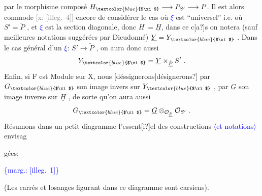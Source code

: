 \documentclass[11pt]{article}
\newcommand{\scanpage}[1]{\par\bigskip\noindent{\small\sffamily[scan #1]}\par}
\newcommand{\mspage}[1]{{\small\sffamily[p.\,#1]}}
\newcommand{\hand}[1]{\textcolor{blue}{#1}}
\let\over\relax
\newcommand{\over}[2]{\textcolor{gray}{#1}\textcolor{blue}{\ensuremath{^{\!\nearrow}}#2}}
\newcommand{\inserted}[2][]{\textcolor{blue}{$\langle$#2$\rangle$}}
\newcommand{\margin}[1]{\textcolor{blue}{\{\textsf{marg.:} #1\}}}
\newcommand{\xout}[1]{\textcolor{gray}{[\textsf{x:} #1]}}
\newcommand{\unsure}[1]{[#1?]}
\newcommand{\illegible}[1]{[\textsf{illeg.\ #1}]}
\newenvironment{diagramblock}{\par\begin{center}}{\end{center}\par}
\begin{document}
\mspage{6}

\clearpage
\scanpage{25/7}
\mspage{4}

par le morphisme composé $H_{\hand{$\xi$}} \longrightarrow P_{S'} \longrightarrow P$. Il est alors commode
\xout{\illegible{4}} encore de considérer le cas où \hand{$\xi$} est
``universel'' i.e. où $S' = \check{P}$ , et \hand{$\xi$} est la section diagonale, donc $H \ = \underline{H}$,
dans ce c\unsure{a}s on notera (sauf meilleures notations suggérées par Dieudonné)
$\underline{Y} = Y_{\hand{$\xi$}}$ . Dans le cas général d'un \hand{$\xi$}: $S' \to \check{P}$ , on aura donc aussi
\[ Y_{\hand{$\xi$}} = \underline{Y} \times_{\check{\underline{P}}} S' \ . \]
Enfin, si F est Module sur X, nous \unsure{déssignerons|désignerons} par $G_{\hand{$\xi$}}$ son image invers
sur $Y_{\hand{$\xi$}}$ , par $\underline{G}$ son image inverse sur $\underline{H}$ , de sorte qu'on aura aussi
\[ G_{\hand{$\xi$}} = \underline{G} \otimes_{\mathcal{O}_{\check{\underline{P}}}} \mathcal{O}_{S'} \ . \]
Résumons dans un petit diagramme l'essent\unsure{i}el des constructions \inserted{et notations} envisag

gées:
\begin{diagramblock}
\end{diagramblock}
\margin{\illegible{1}}

(Les carrés et losanges figurant dans ce diagramme sont car\over{\illegible{1}}{té}siens).
\end{document}
